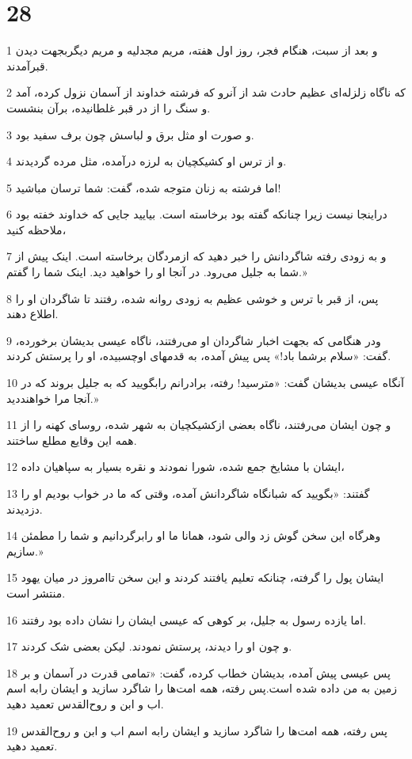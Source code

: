 \chapter{28}

\par 1 و بعد از سبت، هنگام فجر، روز اول هفته، مریم مجدلیه و مریم دیگربجهت دیدن قبر‌آمدند.
\par 2 که ناگاه زلزله‌ای عظیم حادث شد از آنرو که فرشته خداوند از آسمان نزول کرده، آمد و سنگ را از در قبر غلطانیده، برآن بنشست.
\par 3 و صورت او مثل برق و لباسش چون برف سفید بود.
\par 4 و از ترس او کشیکچیان به لرزه درآمده، مثل مرده گردیدند.
\par 5 اما فرشته به زنان متوجه شده، گفت: شما ترسان مباشید!
\par 6 دراینجا نیست زیرا چنانکه گفته بود برخاسته است. بیایید جایی که خداوند خفته بود ملاحظه کنید،
\par 7 و به زودی رفته شاگردانش را خبر دهید که ازمردگان برخاسته است. اینک پیش از شما به جلیل می‌رود. در آنجا او را خواهید دید. اینک شما را گفتم.»
\par 8 پس، از قبر با ترس و خوشی عظیم به زودی روانه شده، رفتند تا شاگردان او را اطلاع دهند.
\par 9 ودر هنگامی که بجهت اخبار شاگردان او می‌رفتند، ناگاه عیسی بدیشان برخورده، گفت: «سلام برشما باد!» پس پیش آمده، به قدمهای اوچسبیده، او را پرستش کردند.
\par 10 آنگاه عیسی بدیشان گفت: «مترسید! رفته، برادرانم رابگویید که به جلیل بروند که در آنجا مرا خواهنددید.»
\par 11 و چون ایشان می‌رفتند، ناگاه بعضی ازکشیکچیان به شهر شده، روسای کهنه را از همه این وقایع مطلع ساختند.
\par 12 ایشان با مشایخ جمع شده، شورا نمودند و نقره بسیار به سپاهیان داده،
\par 13 گفتند: «بگویید که شبانگاه شاگردانش آمده، وقتی که ما در خواب بودیم او را دزدیدند.
\par 14 وهرگاه این سخن گوش زد والی شود، همانا ما او رابرگردانیم و شما را مطمئن سازیم.»
\par 15 ایشان پول را گرفته، چنانکه تعلیم یافتند کردند و این سخن تاامروز در میان یهود منتشر است.
\par 16 اما یازده رسول به جلیل، بر کوهی که عیسی ایشان را نشان داده بود رفتند.
\par 17 و چون او را دیدند، پرستش نمودند. لیکن بعضی شک کردند.
\par 18 پس عیسی پیش آمده، بدیشان خطاب کرده، گفت: «تمامی قدرت در آسمان و بر زمین به من داده شده است.پس رفته، همه امت‌ها را شاگرد سازید و ایشان رابه اسم اب و ابن و روح‌القدس تعمید دهید.
\par 19 پس رفته، همه امت‌ها را شاگرد سازید و ایشان رابه اسم اب و ابن و روح‌القدس تعمید دهید.



